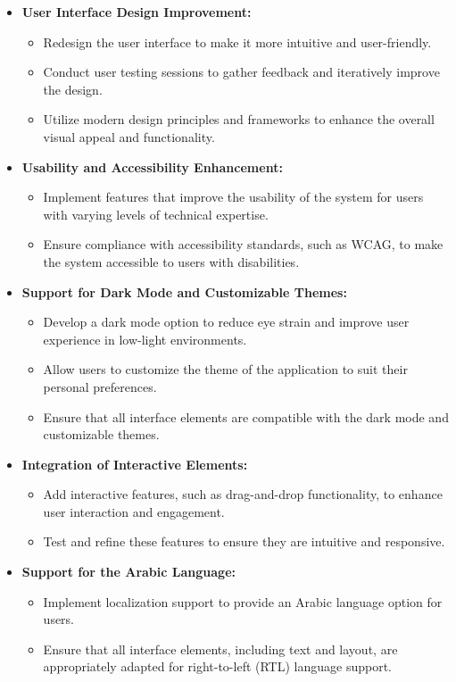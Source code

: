 \begin{itemize}
    \item \textbf{User Interface Design Improvement:}
    \begin{itemize}
        \item Redesign the user interface to make it more intuitive and user-friendly.
        \item Conduct user testing sessions to gather feedback and iteratively improve the design.
        \item Utilize modern design principles and frameworks to enhance the overall visual appeal and functionality.
    \end{itemize}
    
    \item \textbf{Usability and Accessibility Enhancement:}
    \begin{itemize}
        \item Implement features that improve the usability of the system for users with varying levels of technical expertise.
        \item Ensure compliance with accessibility standards, such as WCAG, to make the system accessible to users with disabilities.
    \end{itemize}
    
    \item \textbf{Support for Dark Mode and Customizable Themes:}
    \begin{itemize}
        \item Develop a dark mode option to reduce eye strain and improve user experience in low-light environments.
        \item Allow users to customize the theme of the application to suit their personal preferences.
        \item Ensure that all interface elements are compatible with the dark mode and customizable themes.
    \end{itemize}
    
    \item \textbf{Integration of Interactive Elements:}
    \begin{itemize}
        \item Add interactive features, such as drag-and-drop functionality, to enhance user interaction and engagement.
        \item Test and refine these features to ensure they are intuitive and responsive.
    \end{itemize}
    
    \item \textbf{Support for the Arabic Language:}
    \begin{itemize}
        \item Implement localization support to provide an Arabic language option for users.
        \item Ensure that all interface elements, including text and layout, are appropriately adapted for right-to-left (RTL) language support.
    \end{itemize}
\end{itemize}

